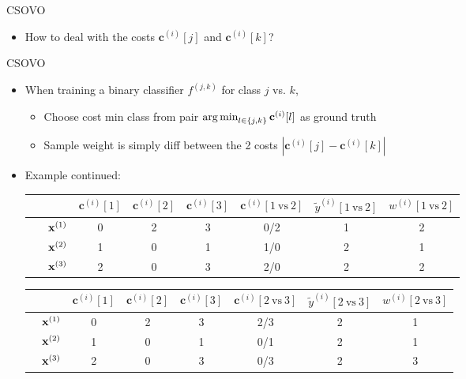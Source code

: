 \documentclass[11pt,compress,t,notes=noshow, xcolor=table]{beamer}
\newcommand{\cv}{\mathbf{c}}
\begin{document}
\begin{vbframe}{CSOVO \href{https://proceedings.mlr.press/v39/lin14.pdf}{}}
\begin{itemize}
\begin{itemize}
            \item How to deal with the costs $\cv^{(i)}[j]$ and $\cv^{(i)}[k]$?
            
        \end{itemize}
            
    \end{itemize}

\end{vbframe}


\begin{vbframe}{CSOVO}
    \begin{itemize}
        \item When training a binary classifier $f^{(j, k)}$ for class $j$ vs. $k$,
        \begin{itemize}
            \item Choose cost min class from pair $\argmin_{l \in \{j, k\}} \cv^{(i)}[l]$ as ground truth 
            
            \item Sample weight is simply diff between the 2 costs      $|\cv^{(i)}[j] - \cv^{(i)}[k]|$

        \end{itemize}
        
        \item Example continued:
\begin{center}
    \footnotesize
                            \begin{tabular}{cc|ccc|ccc}\
        			& & $\cv^{(i)}[1]$ & $\cv^{(i)}[2]$ & $\cv^{(i)}[3]$ & $\cv^{(i)}[1 \ \text{vs} \ 2]$ & $\tilde{y}^{( i)}[1 \ \text{vs} \ 2]$ & $w^{(i)}[1 \ \text{vs} \ 2]$\\
        			\hline & $\mathbf{x}^{(1)}$ & 0 & 2 & 3 & 0/2 & 1 & 2\\
        			& $\mathbf{x}^{(2)}$ & 1 & 0 & 1 & 1/0 & 2 & 1 \\
                 	& $\mathbf{x}^{(3)}$ & 2 & 0 & 3 & 2/0 & 2 & 2\\
                \end{tabular}

                \begin{tabular}{cc|ccc|ccc}
        			& & $\cv^{(i)}[1]$ & $\cv^{(i)}[2]$ & $\cv^{(i)}[3]$ & $\cv^{(i)}[2 \ \text{vs} \ 3]$ & $\tilde{y}^{( i)}[2 \ \text{vs} \ 3]$ & $w^{(i)}[2 \ \text{vs} \ 3]$\\
        			\hline & $\mathbf{x}^{(1)}$ & 0 & 2 & 3 & 2/3 & 2 & 1\\
        			& $\mathbf{x}^{(2)}$ & 1 & 0 & 1 & 0/1 & 2 & 1\\
                 	& $\mathbf{x}^{(3)}$ & 2 & 0 & 3 & 0/3 & 2 & 3\\
                \end{tabular}
\end{center}


\end{itemize}
\end{vbframe}
\end{document}
